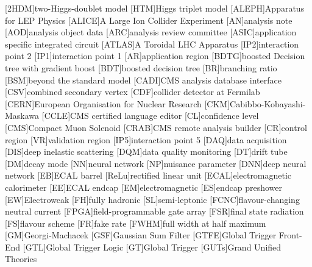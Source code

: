 \begin{acronym}
  [2HDM]{two-Higgs-doublet model}
  [HTM]{Higgs triplet model}
  [ALEPH]{Apparatus for LEP Physics}
  [ALICE]{A Large Ion Collider Experiment}
  [AN]{analysis note}
  [AOD]{analysis object data}
  [ARC]{analysis review committee}
  [ASIC]{application specific integrated circuit}
  [ATLAS]{A Toroidal LHC Apparatus}
  [IP2]{interaction point 2}
  [IP1]{interaction point 1}
  [AR]{application region}
  [BDTG]{boosted Decision tree with gradient boost}
  [BDT]{boosted decision tree}
  [BR]{branching ratio}
  [BSM]{beyond the standard model}
  [CADI]{CMS analysis database interface}
  [CSV]{combined secondary vertex}
  [CDF]{collider detector at Fermilab }
  [CERN]{European Organisation for Nuclear Research}
  [CKM]{Cabibbo-Kobayashi-Maskawa}
  [CCLE]{CMS certified language editor}
  [CL]{confidence level}
  [CMS]{Compact Muon Solenoid}
  [CRAB]{CMS remote analysis builder}
  [CR]{control region}
  [VR]{validation region}
  [IP5]{interaction point 5}
  [DAQ]{data acquisition}
  [DIS]{deep inelastic scattering}
  [DQM]{data quality monitoring}
  [DT]{drift tube}
  [DM]{decay mode}
  [NN]{neural network}
  [NP]{nuisance parameter}
  [DNN]{deep neural network}
  [EB]{\acs{ECAL} barrel}
  [ReLu]{rectified linear unit}
  [ECAL]{electromagnetic calorimeter}
  [EE]{\acs{ECAL} endcap}
  [EM]{electromagnetic}
  [ES]{endcap preshower}
  [EW]{Electroweak}
  [FH]{fully hadronic}
  [SL]{semi-leptonic}
  [FCNC]{flavour-changing neutral current}
  [FPGA]{field-programmable gate array}
  [FSR]{final state radiation}
  [FS]{flavour scheme}
  [FR]{fake rate}
  [FWHM]{full width at half maximum}
  [GM]{Georgi-Machacek}
  [GSF]{Gaussian Sum Filter}
  [GTFE]{Global Trigger Front-End}
  [GTL]{Global Trigger Logic}
  [GT]{Global Trigger}
  [GUTs]{Grand Unified Theories}

\end{acronym}
